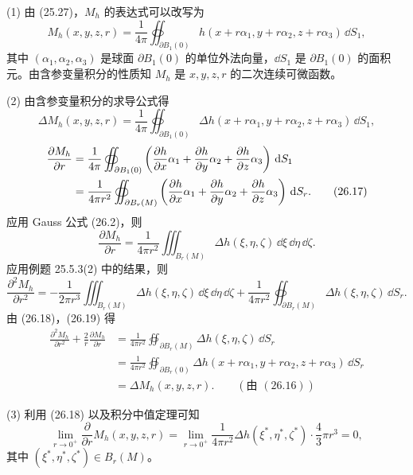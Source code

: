 \begin{xproof}
(1) 由 (25.27)，$M_h$ 的表达式可以改写为
\[
  M_h(x,y,z,r)=\frac{1}{4\pi}\oiint_{\partial B_1(0)}
  h(x+r\alpha_1,y+r\alpha_2,z+r\alpha_3)\,\dd S_1,
\]
其中 $(\alpha_1,\alpha_2,\alpha_3)$ 是球面 $\partial B_1(0)$ 的单位外法向量，$\dd S_1$ 是 $\partial B_1(0)$ 的面积元。由含参变量积分的性质知 $M_h$ 是 $x,y,z,r$ 的二次连续可微函数。

(2) 由含参变量积分的求导公式得
\begin{equation}
  \Delta M_h(x,y,z,r)
  =\frac{1}{4\pi}\oiint_{\partial B_1(0)}
  \Delta h(x+r\alpha_1,y+r\alpha_2,z+r\alpha_3)\,\dd S_1,
  \tag{26.16}
  \label{eq:26.16}
\end{equation}
\begin{align}
  \frac{\partial M_h}{\partial r}
  &=\frac{1}{4\pi}\oiint_{\partial B_1(0)}
  \left(\frac{\partial h}{\partial x}\alpha_1
  +\frac{\partial h}{\partial y}\alpha_2
  +\frac{\partial h}{\partial z}\alpha_3\right)\,\mathop{}\!\mathrm{d} S_1\notag\\
  &=\frac{1}{4\pi r^2}\oiint_{\partial B_r(M)}
  \left(\frac{\partial h}{\partial x}\alpha_1
  +\frac{\partial h}{\partial y}\alpha_2
  +\frac{\partial h}{\partial z}\alpha_3\right)\,\mathop{}\!\mathrm{d} S_r.
  \tag{26.17}
  \label{eq:26.17}
\end{align}
应用 Gauss 公式 (26.2)，则
\begin{equation}
  \frac{\partial M_h}{\partial r}
  =\frac{1}{4\pi r^2}\iiint_{B_r(M)}\Delta h(\xi,\eta,\zeta)\,\dd\xi\,\dd\eta\,\dd\zeta.
  \tag{26.18}
  \label{eq:26.18}
\end{equation}
应用例题 25.5.3(2) 中的结果，则
\begin{equation}
  \frac{\partial^2M_h}{\partial r^2}
  =-\frac{1}{2\pi r^3}\iiint_{B_r(M)}\Delta h(\xi,\eta,\zeta)\,\dd\xi\,\dd\eta\,\dd\zeta
  +\frac{1}{4\pi r^2}\oiint_{\partial B_r(M)}\Delta h(\xi,\eta,\zeta)\,\dd S_r.
  \tag{26.19}
  \label{eq:26.19}
\end{equation}
由 (26.18)，(26.19) 得
\begin{align*}
  \frac{\partial^2M_h}{\partial r^2}+\frac{2}{r}\frac{\partial M_h}{\partial r}
  &=\frac{1}{4\pi r^2}\oiint_{\partial B_r(M)}\Delta h(\xi,\eta,\zeta)\,\dd S_r\\
  &=\frac{1}{4\pi r^2}\oiint_{\partial B_r(0)}\Delta h(x+r\alpha_1,y+r\alpha_2,z+r\alpha_3)\,\dd S_r\\
  &=\Delta M_h(x,y,z,r).\qquad(\text{由 }(26.16))
\end{align*}

(3) 利用 (26.18) 以及积分中值定理可知
\[
  \lim_{r\to0^+}\frac{\partial}{\partial r}M_h(x,y,z,r)
  =\lim_{r\to0^+}\frac{1}{4\pi r^2}\Delta h(\xi^*,\eta^*,\zeta^*)\cdot\frac{4}{3}\pi r^3=0,
\]
其中 $(\xi^*,\eta^*,\zeta^*)\in B_r(M)$。
\end{xproof}

